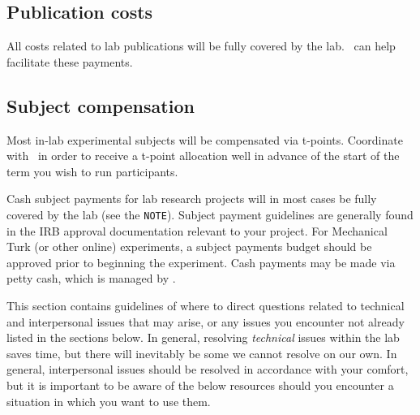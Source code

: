 \documentclass{tufte-book} %
\begin{document}
 \subsection{Publication costs}
 All costs related to lab publications will be fully covered by the
 lab.  \coordinator~can help facilitate these payments.

 \subsection{Subject compensation}
 Most in-lab experimental subjects will be compensated via t-points.
 Coordinate with \coordinator~in order to receive a t-point allocation
 well in advance of the start of the term you wish to run
 participants.

   Cash
 subject payments for lab research projects will in most cases be
 fully covered by the lab (see the \texttt{NOTE}).  Subject payment
 guidelines are generally found in the IRB approval documentation
 relevant to your project.  For Mechanical Turk (or other online) experiments, a subject
 payments budget should be approved prior to beginning the experiment.
 Cash payments may be made via petty cash, which is managed by
 \coordinator.



\noindent This section contains guidelines of where to direct
questions related to technical and interpersonal issues that may
arise, or any issues you encounter not already listed in the sections
below. In general, resolving \textit{technical} issues within the lab
saves time, but there will inevitably be some we cannot resolve on our
own. In general, interpersonal issues should be resolved in accordance
with your comfort, but it is important to be aware of the below
resources should you encounter a situation in which you want to use
them.
\end{document}
